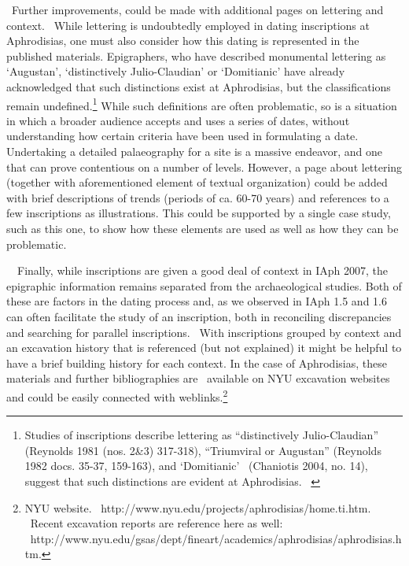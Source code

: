 \documentclass[amsthm,ebook]{saparticle}
\begin{document}
\ Further improvements, could be made with additional pages on lettering and context. \ While lettering is undoubtedly
employed in dating inscriptions at Aphrodisias, one must also consider how this dating is represented in the published
materials. Epigraphers, who have described monumental lettering as ‘Augustan’, ‘distinctively Julio-Claudian’ or
‘Domitianic’ have already acknowledged that such distinctions exist at Aphrodisias, but the classifications remain
undefined.\footnote{ Studies of inscriptions describe lettering as “distinctively Julio-Claudian” (Reynolds 1981 (nos.
2\&3) 317-318), “Triumviral or Augustan” (Reynolds 1982 docs. 35-37, 159-163), and ‘Domitianic’ \ (Chaniotis 2004, no.
14), suggest that such distinctions are evident at Aphrodisias. \ } While such definitions are often problematic, so is
a situation in which a broader audience accepts and uses a series of dates, without understanding how certain criteria
have been used in formulating a date. Undertaking a detailed palaeography for a site is a massive endeavor, and one
that can prove contentious on a number of levels. However, a page about lettering (together with aforementioned element
of textual organization) could be added with brief descriptions of trends (periods of ca. 60-70 years) and references
to a few inscriptions as illustrations. This could be supported by a single case study, such as this one, to show how
these elements are used as well as how they can be problematic.


\bigskip

\ \ Finally, while inscriptions are given a good deal of context in IAph 2007, the epigraphic information remains
separated from the archaeological studies. Both of these are factors in the dating process and, as we observed in IAph
1.5 and 1.6 can often facilitate the study of an inscription, both in reconciling discrepancies and searching for
parallel inscriptions. \ With inscriptions grouped by context and an excavation history that is referenced (but not
explained) it might be helpful to have a brief building history for each context. In the case of Aphrodisias, these
materials and further bibliographies are \ available on NYU excavation websites and could be easily connected with
weblinks.\footnote{ NYU website. \ http://www.nyu.edu/projects/aphrodisias/home.ti.htm. \ Recent excavation reports are
reference here as well: \ http://www.nyu.edu/gsas/dept/fineart/academics/aphrodisias/aphrodisias.htm.}


\bigskip
\end{document}
